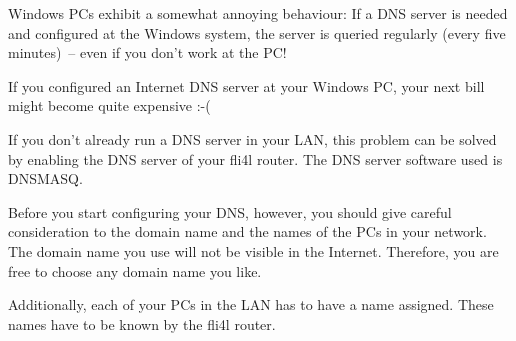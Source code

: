 

  Windows PCs exhibit a somewhat annoying behaviour: If a DNS server is needed
  and configured at the Windows system, the server is queried regularly (every
  five minutes)~-- even if you don't work at the PC!

  If you configured an Internet DNS server at your Windows PC, your next
  bill might become quite expensive :-(

  If you don't already run a DNS server in your LAN, this problem can be
  solved by enabling the DNS server of your fli4l router. The DNS server
  software used is DNSMASQ.

  Before you start configuring your DNS, however, you should give careful
  consideration to the domain name and the names of the PCs in your network.
  The domain name you use will not be visible in the Internet. Therefore, you
  are free to choose any domain name you like.

  Additionally, each of your PCs in the LAN has to have a name assigned. These
  names have to be known by the fli4l router.

